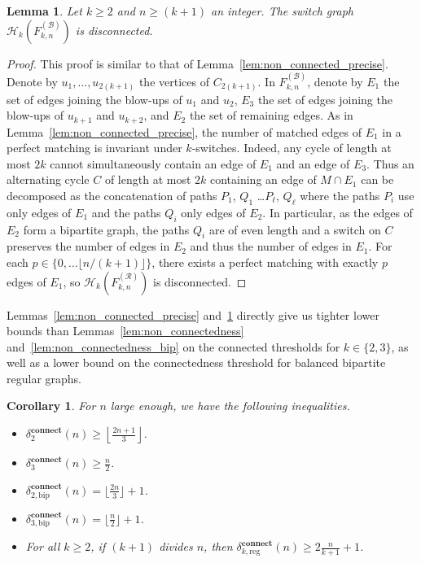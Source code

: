 \documentclass[11pt,a4paper]{article}
\newtheorem{lemma}[theorem]{Lemma}
\newtheorem{corollary}[theorem]{Corollary}
\theoremstyle{definition}
\begin{document}
\begin{lemma}\label{lem:blow-up_cycle}
  Let $k \ge 2$ and $n \ge (k+1)$ an integer. The switch graph $\mathcal H_{k}(F_{k,n}^{(\mathcal B)})$ is disconnected.
\end{lemma}
\begin{proof}
  This proof is similar to that of Lemma~\ref{lem:non_connected_precise}. Denote by $u_1, \dots, u_{2(k+1)}$ the vertices of $C_{2(k+1)}$. In $F_{k,n}^{(\mathcal B)}$, denote by $E_1$ the set of edges joining the blow-ups of  $u_1$ and $u_2$, $E_3$ the set of edges joining the blow-ups of $u_{k+1}$ and $u_{k+2}$, and $E_2$ the set of remaining edges. As in
  Lemma~\ref{lem:non_connected_precise}, the number of matched edges of $E_1$ in a
  perfect matching is invariant under $k$-switches. Indeed, any cycle of length at most $2k$ cannot simultaneously contain an edge of $E_1$ and an edge of $E_3$. Thus an alternating cycle $C$ of length at most $2k$ containing an edge of $M \cap E_1$ can be decomposed as the concatenation of paths $P_1$, $Q_1$ \dots $P_{\ell}$, $Q_\ell$ where the paths $P_i$ use only edges of $E_1$ and the paths $Q_i$ only edges of $E_2$. In particular, as the edges of $E_2$ form a bipartite graph, the paths $Q_i$ are of even length and a switch on $C$ preserves the number of edges in $E_2$ and thus the number of edges in $E_1$. For each
  $p \in \{0, \dots \lfloor n/(k+1) \rfloor\}$, there exists a perfect matching with exactly $p$
  edges of $E_1$, so $\mathcal H_{k}(F_{k,n}^{(\mathcal R)})$ is disconnected.
\end{proof}

Lemmas~\ref{lem:non_connected_precise} and~\ref{lem:blow-up_cycle} directly give us tighter
lower bounds than Lemmas~\ref{lem:non_connectedness} and~\ref{lem:non_connectedness_bip} on the
connected thresholds for $k \in \{2,3\}$, as well as a lower bound on the
connectedness threshold for balanced bipartite regular graphs.
\begin{corollary}\label{cor:connectedness_lower}
  For $n$ large enough, we have the following inequalities.
  \begin{itemize}
  \item 
  $\delta^{\mathbf{connect}}_2(n) \ge \left\lfloor \frac{2n+1}3
    \right\rfloor$.
  \item 
  $\delta^{\mathbf{connect}}_3(n) \ge \frac{n}2$.
  \item 
  $\delta^{\mathbf{connect}}_{2,\mathrm{bip}}(n) = \lfloor \frac{2n}3 \rfloor+1$.
  \item 
  $\delta^{\mathbf{connect}}_{3,\mathrm{bip}}(n) = \lfloor \frac{n}2 \rfloor+1$.
  \item 
  For all $k \ge 2$, if $(k+1)$ divides $n$, then $\delta^{\mathbf{connect}}_{k,\mathrm{reg}}(n) \ge 2\frac{n}{k+1}+1$.
  \end{itemize}
\end{corollary}
\end{document}
